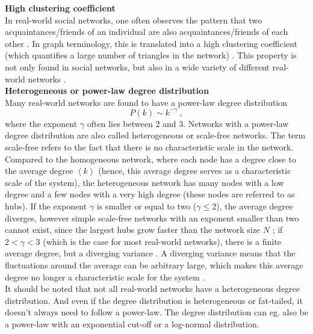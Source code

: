 \documentclass[11 pt , letterpaper , twoside , openright]{book}
\begin{document}
\textbf{High clustering coefficient}\\
\newline
In real-world social networks, one often observes the pattern that two acquaintances/friends of an individual are also acquaintances/friends of each other \cite{RealWorld}. In graph terminology, this is translated into a high clustering coefficient (which quantifies a large number of triangles in the network) \cite{RealWorld}. This property is not only found in social networks, but also in a wide variety of different real-world networks \cite{RealWorld}.\\
\newline
\textbf{Heterogeneous or power-law degree distribution}\\
\newline
Many real-world networks are found to have a power-law degree distribution \cite{RealWorld}
\begin{equation}
	P(k) \sim k^{-\gamma} \ ,
\end{equation}
where the exponent $\gamma$ often lies between 2 and 3. Networks with a power-law degree distribution are also called heterogeneous or scale-free networks. The term scale-free refers to the fact that there is no characteristic scale in the network. Compared to the homogeneous network, where each node has a degree close to the average degree $\left<k\right>$ (hence, this average degree serves as a characteristic scale of the system), the heterogeneous network has many nodes with a low degree and a few nodes with a very high degree (these nodes are referred to as hubs). If the exponent $\gamma$ is smaller or equal to two ($\gamma \leqslant 2$), the average degree diverges, however simple scale-free networks with an exponent smaller than two cannot exist, since the largest hubs grow faster than the network size $N$ \cite{Barabasi2016}; if $2 < \gamma < 3$ (which is the case for most real-world networks), there is a finite average degree, but a diverging variance \cite{Newman2005}. A diverging variance means that the fluctuations around the average can be arbitrary large, which makes this average degree no longer a characteristic scale for the system \cite{Barabasi2016}.\\
It should be noted that not all real-world networks have a heterogeneous degree distribution. And even if the degree distribution is heterogeneous or fat-tailed, it doesn't always need to follow a power-law. The degree distribution can eg. also be a power-law with an exponential cut-off or a log-normal distribution.\\
\end{document}
